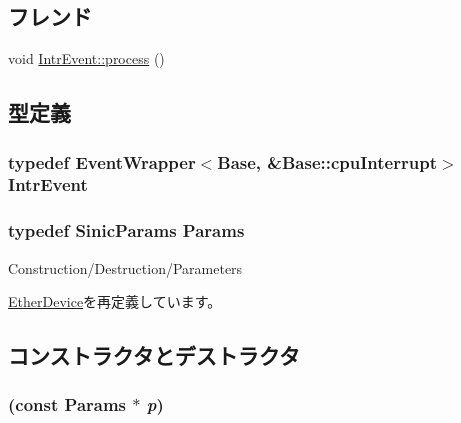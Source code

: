 \subsection*{フレンド}
\begin{DoxyCompactItemize}
\item 
void \hyperlink{classSinic_1_1Base_ae03991571cb7e9ffd0046e10275338fb}{IntrEvent::process} ()
\end{DoxyCompactItemize}


\subsection{型定義}
\hypertarget{classSinic_1_1Base_a09f9d93e16b939356647836884f8f47f}{
\subsubsection[{IntrEvent}]{\setlength{\rightskip}{0pt plus 5cm}typedef {\bf EventWrapper}$<${\bf Base}, \&Base::cpuInterrupt$>$ {\bf IntrEvent}}}
\label{classSinic_1_1Base_a09f9d93e16b939356647836884f8f47f}
\hypertarget{classSinic_1_1Base_ae32fbee6dea75ffbb01b7d869c7bedad}{
\subsubsection[{Params}]{\setlength{\rightskip}{0pt plus 5cm}typedef SinicParams {\bf Params}}}
\label{classSinic_1_1Base_ae32fbee6dea75ffbb01b7d869c7bedad}
Construction/Destruction/Parameters 

\hyperlink{classEtherDevice_afcf43c7944288000e850f783bdd66b9d}{EtherDevice}を再定義しています。

\subsection{コンストラクタとデストラクタ}
\hypertarget{classSinic_1_1Base_ae02136eda3d063396056b352cc26f7e6}{
\subsubsection[{Base}]{ (const {\bf Params} $\ast$ {\em p})}}
\label{classSinic_1_1Base_ae02136eda3d063396056b352cc26f7e6}



